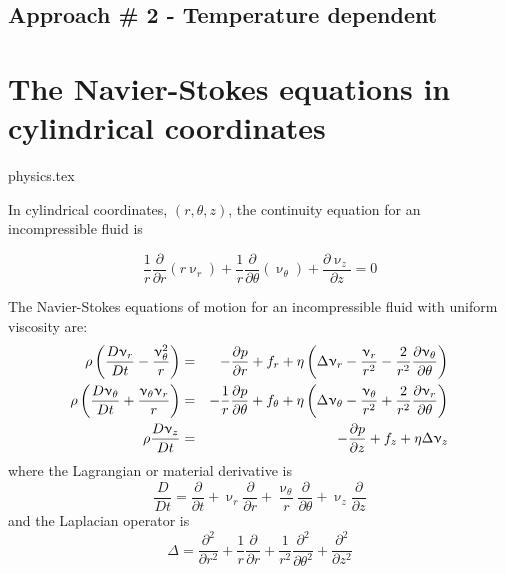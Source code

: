 \subsection{Approach \# 2 - Temperature dependent \label{ss:dimeqs2}}




\section{The Navier-Stokes equations in cylindrical coordinates}
\begin{flushright} {\tiny {\color{gray} physics.tex}} \end{flushright}

In cylindrical coordinates, $(r,\theta,z)$, the continuity equation for an incompressible fluid is 
\begin{mdframed}[backgroundcolor=blue!5]
\begin{equation}
\frac{1}{r} \frac{\partial}{\partial r} (r \upnu_r) + 
\frac{1}{r} \frac{\partial}{\partial \theta} (\upnu_\theta) + 
\frac{\partial \upnu_z}{\partial z} =0
\end{equation}
\end{mdframed}
The Navier-Stokes equations of motion for an incompressible fluid with uniform viscosity are:
\begin{eqnarray}
\rho \left(  \frac{D\upnu_r}{Dt} -\frac{\upnu_\theta^2}{r} \right) 
&=& -\frac{\partial p}{\partial r} + f_r + \eta
\left( \Delta \upnu_r - \frac{\upnu_r}{r^2} - \frac{2}{r^2} \frac{\partial \upnu_\theta}{\partial \theta}
\right)
\nonumber\\
\rho \left(  \frac{D\upnu_\theta}{Dt} +\frac{\upnu_\theta \upnu_r}{r} \right) 
&=&
-\frac{1}{r} \frac{\partial p}{\partial \theta} + f_\theta + \eta
\left(
\Delta \upnu_\theta - \frac{\upnu_\theta}{r^2} + \frac{2}{r^2} \frac{\partial \upnu_r}{\partial\theta}
\right)
\nonumber\\
\rho \frac{D\upnu_z}{Dt} 
&=& 
-\frac{\partial p}{\partial z} + f_z + \eta \Delta \upnu_z
\end{eqnarray}
where the Lagrangian or material derivative is
\[
\frac{D}{Dt} = \frac{\partial}{\partial t} 
+ \upnu_r \frac{\partial}{\partial r}  
+ \frac{\upnu_\theta}{r} \frac{\partial}{\partial \theta}
+ \upnu_z \frac{\partial}{\partial z}  
\]
and the Laplacian operator is   
\begin{equation}
\Delta 
= \frac{\partial^2 }{\partial r^2}  +\frac{1}{r} \frac{\partial }{\partial r}
+ \frac{1}{r^2}  \frac{\partial^2}{\partial \theta^2}
+ \frac{\partial^2 }{\partial z^2}
\end{equation}


